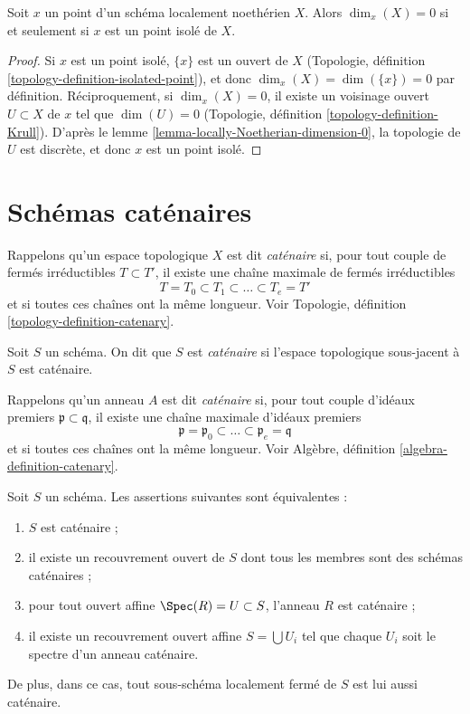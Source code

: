 \begin{lemma}
\label{lemma-isolated-dim-0-locally-noetherian}
Soit $x$ un point d'un schéma localement noethérien $X$.
Alors $\dim_x(X) = 0$ si et seulement si $x$ est un point isolé de $X$.
\end{lemma}

\begin{proof}
Si $x$ est un point isolé, $\{x\}$ est un ouvert de $X$
(Topologie, définition \ref{topology-definition-isolated-point}),
et donc $\dim_x(X) = \dim(\{x\}) = 0$ par définition. Réciproquement, si
$\dim_x(X) = 0$, il existe un voisinage ouvert $U \subset X$
de $x$ tel que $\dim(U) = 0$
(Topologie, définition \ref{topology-definition-Krull}).
D'après le lemme \ref{lemma-locally-Noetherian-dimension-0},
la topologie de $U$ est discrète, et donc
$x$ est un point isolé.
\end{proof}





\section{Schémas caténaires}
\label{section-catenary}

\noindent
Rappelons qu'un espace topologique $X$ est dit {\it caténaire} si,
pour tout couple de fermés irréductibles $T \subset T'$,
il existe une chaîne maximale de fermés irréductibles
$$
T = T_0 \subset T_1 \subset \ldots \subset T_e = T'
$$
et si toutes ces chaînes ont la même longueur. Voir
Topologie, définition \ref{topology-definition-catenary}.

\begin{definition}
\label{definition-catenary}
Soit $S$ un schéma. On dit que $S$ est {\it caténaire} si
l'espace topologique sous-jacent à $S$ est caténaire.
\end{definition}

\noindent
Rappelons qu'un anneau $A$ est dit {\it caténaire} si,
pour tout couple d'idéaux premiers $\mathfrak p \subset \mathfrak q$,
il existe une chaîne maximale d'idéaux premiers
$$
\mathfrak p =
\mathfrak p_0 \subset \ldots \subset \mathfrak p_e
= \mathfrak q
$$
et si toutes ces chaînes ont la même longueur.
Voir Algèbre, définition \ref{algebra-definition-catenary}.

\begin{lemma}
\label{lemma-catenary-local}
Soit $S$ un schéma. Les assertions suivantes sont équivalentes :
\begin{enumerate}
\item $S$ est caténaire ;
\item il existe un recouvrement ouvert de $S$ dont tous les membres sont des
schémas caténaires ;
\item pour tout ouvert affine $\Spec(R) = U \subset S$, l'anneau
$R$ est caténaire ;
\item il existe un recouvrement ouvert affine $S = \bigcup U_i$ tel
que chaque $U_i$ soit le spectre d'un anneau caténaire.
\end{enumerate}
De plus, dans ce cas, tout sous-schéma localement fermé de $S$ est lui aussi
caténaire.
\end{lemma}

